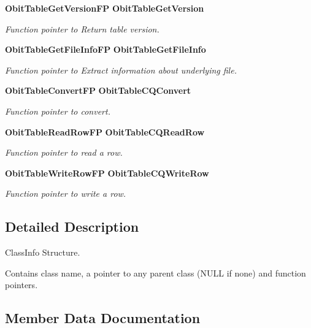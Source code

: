 \begin{CompactItemize}
{\bf Obit\-Table\-Get\-Version\-FP} {\bf Obit\-Table\-Get\-Version}
\begin{CompactList}\small\item\em Function pointer to Return table version. \item\end{CompactList}\item 
{\bf Obit\-Table\-Get\-File\-Info\-FP} {\bf Obit\-Table\-Get\-File\-Info}
\begin{CompactList}\small\item\em Function pointer to Extract information about underlying file. \item\end{CompactList}\item 
{\bf Obit\-Table\-Convert\-FP} {\bf Obit\-Table\-CQConvert}
\begin{CompactList}\small\item\em Function pointer to convert. \item\end{CompactList}\item 
{\bf Obit\-Table\-Read\-Row\-FP} {\bf Obit\-Table\-CQRead\-Row}
\begin{CompactList}\small\item\em Function pointer to read a row. \item\end{CompactList}\item 
{\bf Obit\-Table\-Write\-Row\-FP} {\bf Obit\-Table\-CQWrite\-Row}
\begin{CompactList}\small\item\em Function pointer to write a row. \item\end{CompactList}\end{CompactItemize}


\subsection{Detailed Description}
Class\-Info Structure. 

Contains class name, a pointer to any parent class (NULL if none) and function pointers. 



\subsection{Member Data Documentation}
